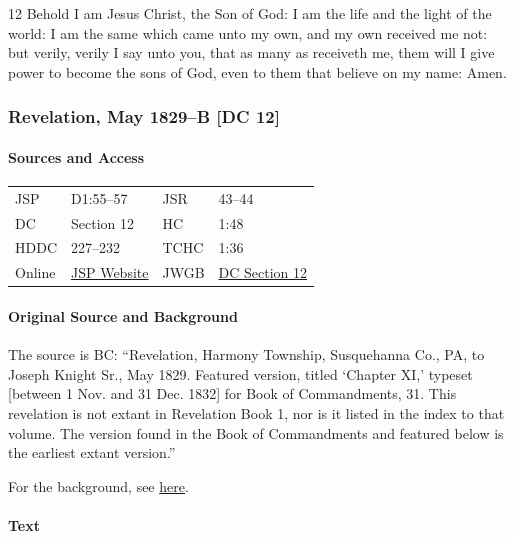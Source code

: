 				12 Behold I am Jesus Christ, the Son of God: I am the life and the light of the world: I am the same which came unto my own, and my own received me not: but verily, verily I say unto you, that as many as receiveth me, them will I give power to become the sons of God, even to them that believe on my name: Amen.
			
		\subsubsection{Revelation, May 1829--B [DC 12]}
			\label{EMS-1828-1829-JS-MAY-1829-B}
			
			\paragraph{Sources and Access}

				\begin{tabular}{p{1in}p{1.5in}p{1in}p{1.5in}}
				JSP	 	& D1:55--57		& JSR 		& 43--44	 \\  
				DC	 	& Section 12 	& HC 		& 1:48		 \\
				HDDC 	& 227--232 		& TCHC 		& 1:36		 \\
				Online  & \href{https://www.josephsmithpapers.org/paper-summary/revelation-may-1829-b-dc-12/1}{JSP Website} & 
				JWGB	& \hyperref[DC12]{DC Section 12} \\
				\end{tabular}
			
			\paragraph{Original Source and Background}
			
				The source is BC: ``Revelation, Harmony Township, Susquehanna Co., PA, to Joseph Knight Sr., May 1829. Featured version, titled `Chapter XI,' typeset [between 1 Nov. and 31 Dec. 1832] for Book of Commandments, 31. This revelation is not extant in Revelation Book 1, nor is it listed in the index to that volume. The version found in the Book of Commandments and featured below is the earliest extant version.''
				
				For the background, see \hyperref[DC12-HB]{here}.
			
			\paragraph{Text}
			
